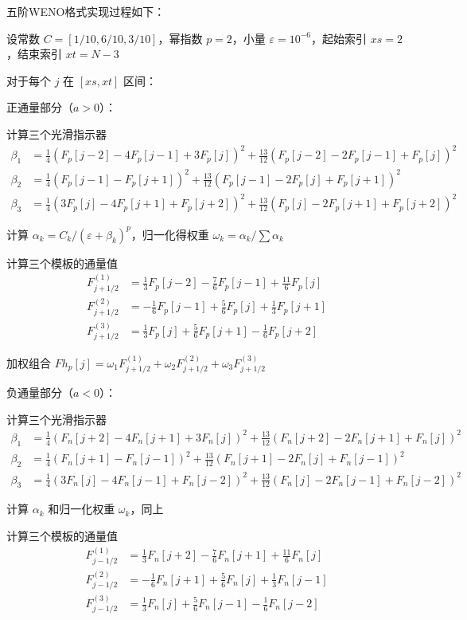 \documentclass[12pt,a4paper]{article}
\begin{document}
五阶WENO格式实现过程如下：

设常数 $C = [1/10, 6/10, 3/10]$，幂指数 $p=2$，小量 $\varepsilon=10^{-6}$，起始索引 $xs=2$，结束索引 $xt=N-3$

对于每个 $j$ 在 $[xs, xt]$ 区间：

正通量部分（$a>0$）：

计算三个光滑指示器
\begin{align*}
    \beta_1 &= \frac{1}{4}(F_p[j-2] - 4F_p[j-1] + 3F_p[j])^2 + \frac{13}{12}(F_p[j-2] - 2F_p[j-1] + F_p[j])^2 \\
    \beta_2 &= \frac{1}{4}(F_p[j-1] - F_p[j+1])^2 + \frac{13}{12}(F_p[j-1] - 2F_p[j] + F_p[j+1])^2 \\
    \beta_3 &= \frac{1}{4}(3F_p[j] - 4F_p[j+1] + F_p[j+2])^2 + \frac{13}{12}(F_p[j] - 2F_p[j+1] + F_p[j+2])^2
\end{align*}

计算 $\alpha_k = C_k / (\varepsilon + \beta_k)^p$，归一化得权重 $\omega_k = \alpha_k / \sum \alpha_k$

计算三个模板的通量值
\begin{align*}
    F^{(1)}_{j+1/2} &= \frac{1}{3}F_p[j-2] - \frac{7}{6}F_p[j-1] + \frac{11}{6}F_p[j] \\
    F^{(2)}_{j+1/2} &= -\frac{1}{6}F_p[j-1] + \frac{5}{6}F_p[j] + \frac{1}{3}F_p[j+1] \\
    F^{(3)}_{j+1/2} &= \frac{1}{3}F_p[j] + \frac{5}{6}F_p[j+1] - \frac{1}{6}F_p[j+2]
\end{align*}

加权组合 $Fh_p[j] = \omega_1 F^{(1)}_{j+1/2} + \omega_2 F^{(2)}_{j+1/2} + \omega_3 F^{(3)}_{j+1/2}$

负通量部分（$a<0$）：

计算三个光滑指示器
\begin{align*}
    \beta_1 &= \frac{1}{4}(F_n[j+2] - 4F_n[j+1] + 3F_n[j])^2 + \frac{13}{12}(F_n[j+2] - 2F_n[j+1] + F_n[j])^2 \\
    \beta_2 &= \frac{1}{4}(F_n[j+1] - F_n[j-1])^2 + \frac{13}{12}(F_n[j+1] - 2F_n[j] + F_n[j-1])^2 \\
    \beta_3 &= \frac{1}{4}(3F_n[j] - 4F_n[j-1] + F_n[j-2])^2 + \frac{13}{12}(F_n[j] - 2F_n[j-1] + F_n[j-2])^2
\end{align*}

计算 $\alpha_k$ 和归一化权重 $\omega_k$，同上

计算三个模板的通量值
\begin{align*}
    F^{(1)}_{j-1/2} &= \frac{1}{3}F_n[j+2] - \frac{7}{6}F_n[j+1] + \frac{11}{6}F_n[j] \\
    F^{(2)}_{j-1/2} &= -\frac{1}{6}F_n[j+1] + \frac{5}{6}F_n[j] + \frac{1}{3}F_n[j-1] \\
    F^{(3)}_{j-1/2} &= \frac{1}{3}F_n[j] + \frac{5}{6}F_n[j-1] - \frac{1}{6}F_n[j-2]
\end{align*}
\end{document}
